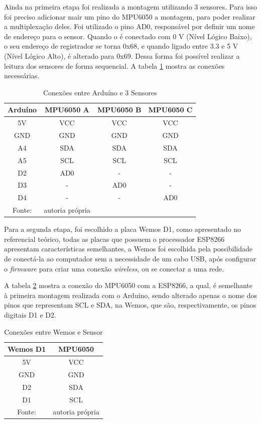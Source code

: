 		Ainda na primeira etapa foi realizada a montagem utilizando 3 sensores.  Para isso foi preciso adicionar mair um pino do MPU6050 a montagem, para poder realizar a multiplexação deles. Foi utilizado o pino AD0, responsável por definir um nome de endereço para o sensor. Quando o é conectado com 0 V (Nível Lógico Baixo), o seu endereço de registrador se torna 0x68, e quando ligado entre 3.3 e 5 V (Nível Lógico Alto), é alterado para 0x69.  Dessa forma foi possível realizar a leitura dos sensores de forma sequencial. A tabela \ref{conexoes_mult} mostra as conexões necessárias.
		
		 	\begin{table}[h] \footnotesize
		 	\centering
		 	\caption{Conexões entre Arduíno e 3 Sensores }
		 	\label{conexoes_mult}
		 	
		 	\begin{tabular}{cccc}
		 		\toprule
		 		\textbf{Arduíno} & \textbf{MPU6050 A} & \textbf{MPU6050 B} & \textbf{MPU6050 C} \\
		 		\midrule
		 		5V & VCC & VCC & VCC  \\
		 		GND & GND & GND & GND\\
		 		A4 & SDA & SDA & SDA  \\
		 		A5 & SCL & SCL & SCL \\
		 		D2 & AD0 & - & - \\
		 		D3 & - & AD0 & - \\
		 		D4 & - & - & AD0 \\
		 		\bottomrule
		 		Fonte: & autoria própria
		 	\end{tabular}
		 \end{table}
	 
	 Para a segunda etapa, foi escolhido a placa Wemos D1,  como apresentado no referencial teórico, todas as placas que possuem o processador ESP8266 apresentam características  semelhantes, a Wemos foi escolhida pela possibilidade de conectá-la ao computador sem a necessidade de um cabo USB, após configurar o \textit{firmware} para criar uma conexão \textit{wireless}, ou se conectar a uma rede. 
	 
	 A tabela \ref{conexoes_esp} mostra a conexão do MPU6050 com a ESP8266, a qual,  é semelhante à primeira montagem realizada com o Arduino, sendo alterado apenas o nome dos pinos que representam SCL e SDA, na Wemos, que são, respectivamente, os pinos digitais D1 e D2.
	  
	 \begin{table}[h] \footnotesize
	 	\centering
	 	\caption{Conexões entre Wemos e Sensor  }
	 	\label{conexoes_esp}
	 	
	 	\begin{tabular}{cc}
	 		\toprule
	 		\textbf{Wemos D1} & \textbf{MPU6050} \\
	 		\midrule
	 		5V & VCC \\
	 		GND & GND \\
	 		D2  & SDA  \\
	 		D1 & SCL \\
	 		\bottomrule
	 		Fonte: & autoria própria
	 	\end{tabular}
	 \end{table}
 
